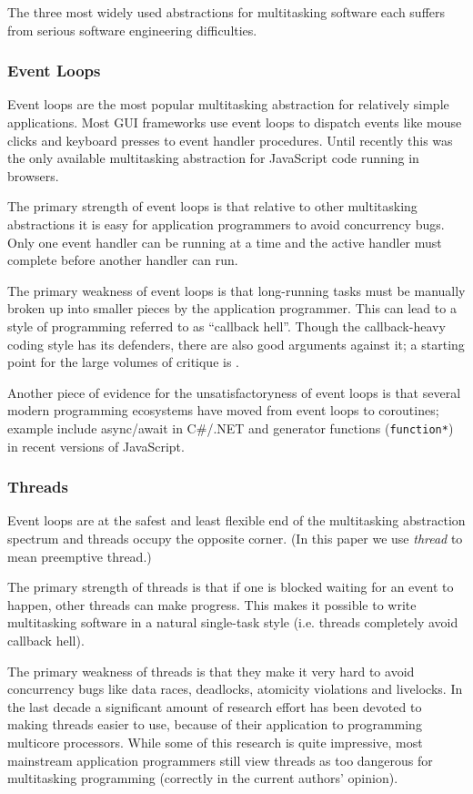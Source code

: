 \documentclass[11pt,preprint]{sigplanconf}
\begin{document}
The three most widely used abstractions for multitasking software each suffers from serious software engineering difficulties.

\subsubsection{Event Loops}

Event loops are the most popular multitasking abstraction for relatively simple applications.
Most GUI frameworks use event loops to dispatch events like mouse clicks and keyboard presses to event handler procedures.
Until recently this was the only available multitasking abstraction for JavaScript code running in browsers.

The primary strength of event loops is that relative to other multitasking abstractions it is easy for application programmers to avoid concurrency bugs.
Only one event handler can be running at a time and the active handler must complete before another handler can run.

The primary weakness of event loops is that long-running tasks must be manually broken up into smaller pieces by the application programmer.
This can lead to a style of programming referred to as ``callback hell''.
Though the callback-heavy coding style has its defenders, there are also good arguments against it; a starting point for the large volumes of critique is \cite{Behren2003a}.

Another piece of evidence for the unsatisfactoryness of event loops is that several modern programming ecosystems have moved from event loops to coroutines; example include async/await in C#/.NET and generator functions (\texttt{function*}) in recent versions of JavaScript.

\subsubsection{Threads}

Event loops are at the safest and least flexible end of the multitasking abstraction spectrum and threads occupy the opposite corner.
(In this paper we use \emph{thread} to mean preemptive thread.)

The primary strength of threads is that if one is blocked waiting for an event to happen, other threads can make progress.
This makes it possible to write multitasking software in a natural single-task style (i.e. threads completely avoid callback hell).

The primary weakness of threads is that they make it very hard to avoid concurrency bugs like data races, deadlocks, atomicity violations and livelocks.
In the last decade a significant amount of research effort has been devoted to making threads easier to use, because of their application to programming multicore processors.
While some of this research is quite impressive, most mainstream application programmers still view threads as too dangerous for multitasking programming (correctly in the current authors' opinion).
\end{document}
